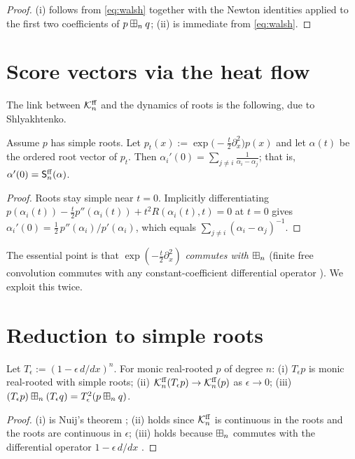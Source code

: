 \documentclass[11pt]{article}
\begin{document}
\begin{proof}
(i) follows from \eqref{eq:walsh} together with the Newton identities applied
to the first two coefficients of $p\boxplus_n q$; (ii) is immediate from
\eqref{eq:walsh}.
\end{proof}

\section*{Score vectors via the heat flow}

The link between $\mathcal{K}^{\mathrm{ff}}_n$ and the dynamics of roots is the following, due to
Shlyakhtenko.

\begin{qfourlemma}\label{lem:heat}
Assume $p$ has simple roots. Let $p_t(x):=\exp\!\bigl(-\tfrac{t}{2}\partial_x^2\bigr)p(x)$
and let $\alpha(t)$ be the ordered root vector of $p_t$. Then
$\alpha_i'(0)=\sum_{j\ne i}\frac{1}{\alpha_i-\alpha_j}$; that is,
$\alpha'(0)=\mathsf{S}^{\mathrm{ff}}_n(\alpha)$.
\end{qfourlemma}

\begin{proof}
Roots stay simple near $t=0$. Implicitly differentiating
$p(\alpha_i(t))-\tfrac{t}{2}p''(\alpha_i(t))+t^2R(\alpha_i(t),t)=0$ at $t=0$
gives $\alpha_i'(0)=\tfrac12\,p''(\alpha_i)/p'(\alpha_i)$, which equals
$\sum_{j\ne i}(\alpha_i-\alpha_j)^{-1}$.
\end{proof}

The essential point is that $\exp(-\tfrac t2\partial_x^2)$ \emph{commutes with}
$\boxplus_n$ (finite free convolution commutes with any constant-coefficient
differential operator \cite{MSS22}). We exploit this twice.

\section*{Reduction to simple roots}

\begin{qfourlemma}\label{lem:simple}
Let $T_\epsilon:=(1-\epsilon\,d/dx)^n$. For monic real-rooted $p$ of degree $n$:
(i) $T_\epsilon p$ is monic real-rooted with simple roots; (ii)
$\mathcal{K}^{\mathrm{ff}}_n(T_\epsilon p)\to\mathcal{K}^{\mathrm{ff}}_n(p)$ as $\epsilon\to0$; (iii)
$(T_\epsilon p)\boxplus_n(T_\epsilon q)=T_\epsilon^2(p\boxplus_n q)$.
\end{qfourlemma}

\begin{proof}
(i) is Nuij's theorem \cite{Nuij}; (ii) holds since $\mathcal{K}^{\mathrm{ff}}_n$ is continuous in
the roots and the roots are continuous in $\epsilon$; (iii) holds because $\boxplus_n$
commutes with the differential operator $1-\epsilon\,d/dx$ \cite{MSS22}.
\end{proof}
\end{document}
